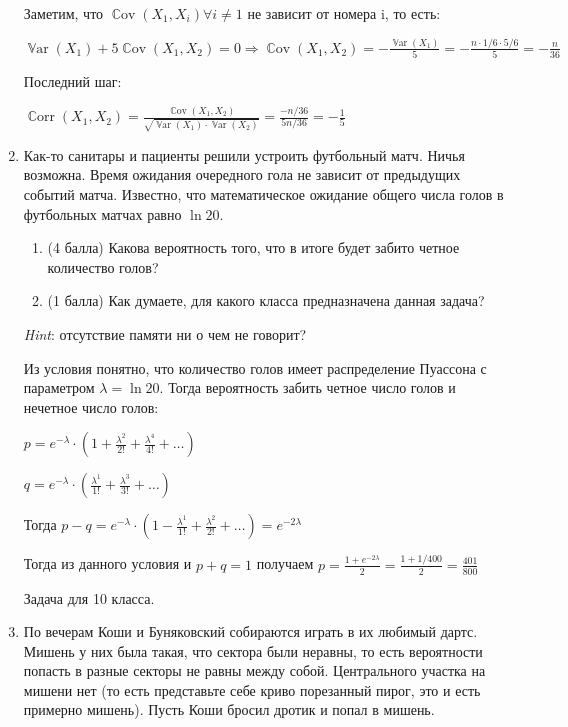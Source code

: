\documentclass[12pt]{article}
\DeclareMathOperator{\Var}{\mathbb{V}ar}
\DeclareMathOperator{\Cov}{\mathbb{C}ov}
\DeclareMathOperator{\Corr}{\mathbb{C}orr}
\newenvironment{solution}{}{}
\begin{document}
\begin{enumerate}
\begin{solution}
    Заметим, что $\Cov(X_1, X_i) \forall i \neq 1$ не зависит от номера i, то есть:
    
    $\Var(X_1) + 5\Cov(X_1, X_2) = 0 \Rightarrow \Cov(X_1, X_2) = -\frac{\Var(X_1)}{5} = -\frac{n \cdot 1/6 \cdot 5/6}{5} = -\frac{n}{36}$
    
    Последний шаг:
    
    $\Corr(X_1, X_2) = \frac{\Cov(X_1, X_2)}{\sqrt{\Var(X_1) \cdot \Var(X_2)}} = \frac{-n / 36}{5n/36} = -\frac{1}{5}$
\end{solution}
    
    \item Как-то санитары и пациенты решили устроить футбольный матч. Ничья возможна. Время ожидания очередного гола не зависит от предыдущих событий матча. Известно, что математическое ожидание общего числа голов в футбольных матчах равно $\ln{20}$. 
    
    \begin{enumerate}
        \item (4 балла) Какова вероятность того, что в итоге будет забито четное количество голов?    
        
        \item (1 балла) Как думаете, для какого класса предназначена данная задача?
    \end{enumerate}
    
    \textit{Hint}: отсутствие памяти ни о чем не говорит?
    
\begin{solution}
    Из условия понятно, что количество голов имеет распределение Пуассона с параметром $\lambda = \ln{20}$. Тогда вероятность забить четное число голов и нечетное число голов:
    
    $p = e^{-\lambda} \cdot (1 + \frac{\lambda^2}{2!} + \frac{\lambda^4}{4!} + \dots)$
    
    $q = e^{-\lambda} \cdot (\frac{\lambda^1}{1!} + \frac{\lambda^3}{3!} + \dots)$
    
    Тогда $p - q = e^{-\lambda} \cdot(1 - \frac{\lambda^1}{1!} + \frac{\lambda^2}{2!} + \dots) = e^{-2\lambda}$
    
    Тогда из данного условия и $p + q = 1$ получаем $p = \frac{1 + e^{-2\lambda}}{2} = \frac{1 + 1/400}{2} = \frac{401}{800}$
    
    Задача для 10 класса.
\end{solution}
    
    \item По вечерам Коши и Буняковский собираются играть в их любимый дартс. Мишень у них была такая, что сектора были неравны, то есть вероятности попасть в разные секторы не равны между собой. Центрального участка на мишени нет (то есть представьте себе криво порезанный пирог, это и есть примерно мишень). Пусть Коши бросил дротик и попал в мишень.
    

\end{enumerate}
\end{document}
